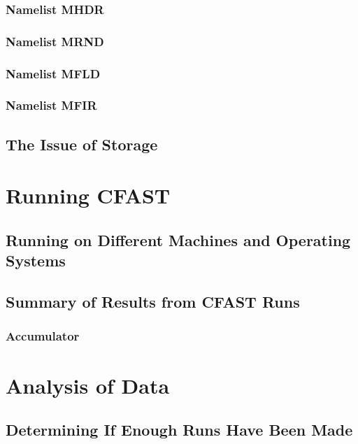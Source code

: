 \documentclass[12pt,twoside]{book}
\begin{document}
\subsection{Namelist MHDR}

\subsection{Namelist MRND}

\subsection{Namelist MFLD}

\subsection{Namelist MFIR}

\section{The Issue of Storage}

%
%

\chapter{Running CFAST}

\section{Running on Different Machines and Operating Systems}

\section{Summary of Results from CFAST Runs}

\subsection{Accumulator}

%
%

\chapter{Analysis of Data}

\section{Determining If Enough Runs Have Been Made}
\end{document}
